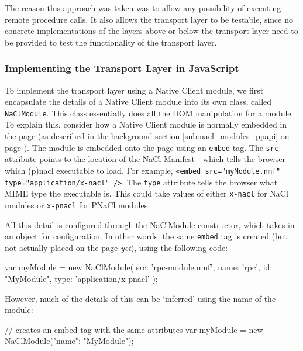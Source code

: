 The reason this approach was taken was to allow any possibility of executing remote procedure calls. It also allows the transport layer to be testable, since no concrete implementations of the layers above or below the transport layer need to be provided to test the functionality of the transport layer.


\subsubsection{Implementing the Transport Layer in JavaScript} %
\label{ssub:implementing_the_transport_layer_in_javascript}
To implement the transport layer using a Native Client module, we first encapsulate the details of a Native Client module into its own class, called \lstinline{NaClModule}. This class essentially does all the DOM manipulation for a module. To explain this, consider how a Native Client module is normally embedded in the page (as described in the background section \ref{sub:nacl_modules_ppapi} on page \pageref{sub:nacl_modules_ppapi}). The module is embedded onto the page using an \lstinline{embed} tag. The \lstinline{src} attribute points to the location of the NaCl Manifest - which tells the browser which (p)nacl executable to load. For example, \lstinline{<embed src="myModule.nmf" type="application/x-nacl" />}. The \lstinline{type} attribute tells the browser what MIME type the executable is. This could take values of either \lstinline{x-nacl} for NaCl modules or \lstinline{x-pnacl} for PNaCl modules. 

All this detail is configured through the NaClModule constructor, which takes in an object for configuration. In other words, the same \lstinline{embed} tag is created (but not actually placed on the page \emph{yet}), using the following code:

\begin{code}
var myModule = new NaClModule({
  src: 'rpc-module.nmf', 
  name: 'rpc', 
  id: "MyModule", 
  type: 'application/x-pnacl'
});
\end{code}

However, much of the details of this can be `inferred' using the name of the module:

\begin{code}
// creates an embed tag with the same attributes
var myModule = new NaClModule({"name": "MyModule"});
\end{code}

